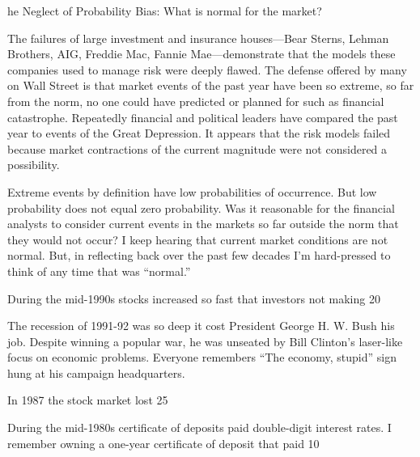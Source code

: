 he Neglect of Probability Bias: What is normal for the market?

The failures of large investment and insurance houses—Bear Sterns, Lehman Brothers, AIG, Freddie Mac, Fannie Mae—demonstrate that the models these companies used to manage risk were deeply flawed. The defense offered by many on Wall Street is that market events of the past year have been so extreme, so far from the norm, no one could have predicted or planned for such as financial catastrophe. Repeatedly financial and political leaders have compared the past year to events of the Great Depression. It appears that the risk models failed because market contractions of the current magnitude were not considered a possibility.

Extreme events by definition have low probabilities of occurrence. But low probability does not equal zero probability. Was it reasonable for the financial analysts to consider current events in the markets so far outside the norm that they would not occur? I keep hearing that current market conditions are not normal. But, in reflecting back over the past few decades I’m hard-pressed to think of any time that was “normal.”

During the mid-1990s stocks increased so fast that investors not making 20%

The recession of 1991-92 was so deep it cost President George H. W. Bush his job. Despite winning a popular war, he was unseated by Bill Clinton’s laser-like focus on economic problems. Everyone remembers “The economy, stupid” sign hung at his campaign headquarters.

In 1987 the stock market lost 25%

During the mid-1980s certificate of deposits paid double-digit interest rates. I remember owning a one-year certificate of deposit that paid 10%

